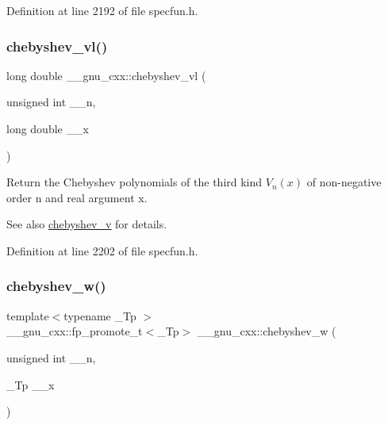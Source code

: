Definition at line 2192 of file specfun.\+h.

\mbox{\label{group__mathsf__gnu_gae387ee1bfcd52555ad4d690f5888a078}} 
\subsubsection{\texorpdfstring{chebyshev\+\_\+vl()}{chebyshev\_vl()}}
{\footnotesize\ttfamily long double \+\_\+\+\_\+gnu\+\_\+cxx\+::chebyshev\+\_\+vl (\begin{DoxyParamCaption}\item[{unsigned int}]{\+\_\+\+\_\+n,  }\item[{long double}]{\+\_\+\+\_\+x }\end{DoxyParamCaption})\hspace{0.3cm}{\ttfamily [inline]}}

Return the Chebyshev polynomials of the third kind $ V_n(x) $ of non-\/negative order {\ttfamily n} and real argument {\ttfamily x}.

\begin{DoxySeeAlso}{See also}
\hyperlink{group__mathsf__gnu_ga32b7decd0002f542d2c9187c5f0846c6}{chebyshev\+\_\+v} for details. 
\end{DoxySeeAlso}


Definition at line 2202 of file specfun.\+h.

\mbox{\label{group__mathsf__gnu_gaa156c6c21e99104ebcb627e92aceada0}} 
\subsubsection{\texorpdfstring{chebyshev\+\_\+w()}{chebyshev\_w()}}
{\footnotesize\ttfamily template$<$typename \+\_\+\+Tp $>$ \\
\+\_\+\+\_\+gnu\+\_\+cxx\+::fp\+\_\+promote\+\_\+t$<$\+\_\+\+Tp$>$ \+\_\+\+\_\+gnu\+\_\+cxx\+::chebyshev\+\_\+w (\begin{DoxyParamCaption}\item[{unsigned int}]{\+\_\+\+\_\+n,  }\item[{\+\_\+\+Tp}]{\+\_\+\+\_\+x }\end{DoxyParamCaption})\hspace{0.3cm}{\ttfamily [inline]}}

